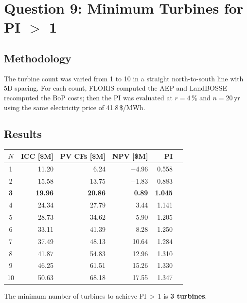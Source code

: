 \documentclass[11pt,a4paper]{article}
\begin{document}
	\section{Question 9: Minimum Turbines for PI $>$ 1}
	
	\subsection{Methodology}
	
	The turbine count was varied from 1 to 10 in a straight north-to-south line with
	5D spacing.  For each count, FLORIS computed the AEP and LandBOSSE recomputed the
	BoP costs; then the PI was evaluated at $r = 4\,\%$ and $n = 20\,\text{yr}$ using
	the same electricity price of 41.8\,\$/MWh.
	
	\subsection{Results}
	
	\begin{center}
		\begin{tabular}{crrrrr}
			\toprule
			$N$ & ICC [\$M] & PV CFs [\$M] & NPV [\$M] & PI \\
			\midrule
			1  & 11.20 &  6.24 & $-$4.96 & 0.558 \\
			2  & 15.58 & 13.75 & $-$1.83 & 0.883 \\
			\textbf{3} & \textbf{19.96} & \textbf{20.86} & \textbf{0.89} & \textbf{1.045} \\
			4  & 24.34 & 27.79 & 3.44 & 1.141 \\
			5  & 28.73 & 34.62 & 5.90 & 1.205 \\
			6  & 33.11 & 41.39 & 8.28 & 1.250 \\
			7  & 37.49 & 48.13 &10.64 & 1.284 \\
			8  & 41.87 & 54.83 &12.96 & 1.310 \\
			9  & 46.25 & 61.51 &15.26 & 1.330 \\
			10 & 50.63 & 68.18 &17.55 & 1.347 \\
			\bottomrule
		\end{tabular}
	\end{center}
	
	\vspace{0.4em}
	The minimum number of turbines to achieve PI\,$>$\,1 is \textbf{3 turbines}.
	
\end{document}
